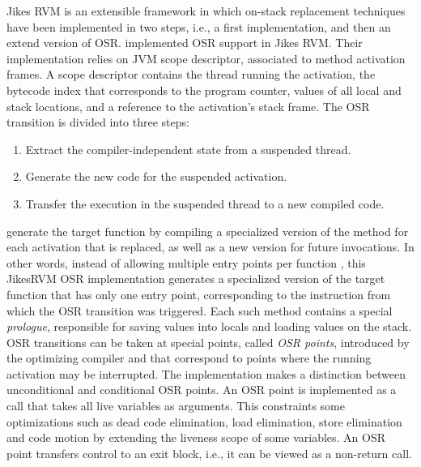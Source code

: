 Jikes RVM is an extensible framework in which on-stack replacement techniques have been implemented in two steps, i.e., a first implementation\cite{fink2003design}, and then an extend version of OSR\cite{soman2006efficient}.
 implemented OSR support in Jikes RVM. 
Their implementation relies on JVM scope descriptor, associated to method activation frames.
A scope descriptor contains the thread running the activation, the bytecode index that corresponds to the program counter, values of all local and stack locations, and a reference to the activation's stack frame.
The OSR transition is divided into three steps: 
\begin{enumerate}
    \item Extract the compiler-independent state from a suspended thread. 
    \item Generate the new code for the suspended activation.
    \item Transfer the execution in the suspended thread to a new compiled code.
\end{enumerate}
 generate the target function by compiling a specialized version of the method for each activation that is replaced, as well as a new version for future invocations.
In other words, instead of allowing multiple entry points per function \cite{lameed2013modular, paleczny2001java}, this JikesRVM OSR implementation generates a specialized version of the target function that has only one entry point, corresponding to the instruction from which the OSR transition was triggered.
Each such method contains a special \textit{prologue}, responsible for saving values into locals and loading values on the stack.
OSR transitions can be taken at special points, called \textit{OSR points}, introduced by the optimizing compiler and that correspond to points where the running activation may be interrupted.
The implementation makes a distinction between unconditional and conditional OSR points.
An OSR point is implemented as a call that takes all live variables as arguments. 
This constraints some optimizations such as dead code elimination, load elimination, store elimination and code motion by extending the liveness scope of some variables.
An OSR point transfers control to an exit block, i.e., it can be viewed as a non-return call.\\

